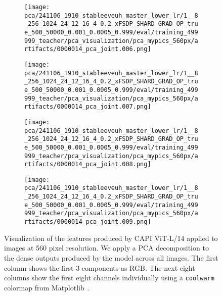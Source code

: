 \begin{figure*}[p]
\begin{subfigure}[t]{0.097\textwidth}
    \end{subfigure}\hfill
    \begin{subfigure}[t]{0.097\textwidth}
        \centering
        \texttt{[image: pca/241106\_1910\_stableeveuh\_master\_lower\_lr/1\_\_8\_256\_1024\_24\_12\_16\_4\_0.2\_xFSDP\_SHARD\_GRAD\_OP\_true\_500\_50000\_0.001\_0.0005\_0.999/eval/training\_499999\_teacher/pca\_visualization/pca\_mypics\_560px/artifacts/0000014\_pca\_joint.006.png]}
    \end{subfigure}\hfill
    \begin{subfigure}[t]{0.097\textwidth}
        \centering
        \texttt{[image: pca/241106\_1910\_stableeveuh\_master\_lower\_lr/1\_\_8\_256\_1024\_24\_12\_16\_4\_0.2\_xFSDP\_SHARD\_GRAD\_OP\_true\_500\_50000\_0.001\_0.0005\_0.999/eval/training\_499999\_teacher/pca\_visualization/pca\_mypics\_560px/artifacts/0000014\_pca\_joint.007.png]}
    \end{subfigure}\hfill
    \begin{subfigure}[t]{0.097\textwidth}
        \centering
        \texttt{[image: pca/241106\_1910\_stableeveuh\_master\_lower\_lr/1\_\_8\_256\_1024\_24\_12\_16\_4\_0.2\_xFSDP\_SHARD\_GRAD\_OP\_true\_500\_50000\_0.001\_0.0005\_0.999/eval/training\_499999\_teacher/pca\_visualization/pca\_mypics\_560px/artifacts/0000014\_pca\_joint.008.png]}
    \end{subfigure}\hfill
    \begin{subfigure}[t]{0.097\textwidth}
        \centering
        \texttt{[image: pca/241106\_1910\_stableeveuh\_master\_lower\_lr/1\_\_8\_256\_1024\_24\_12\_16\_4\_0.2\_xFSDP\_SHARD\_GRAD\_OP\_true\_500\_50000\_0.001\_0.0005\_0.999/eval/training\_499999\_teacher/pca\_visualization/pca\_mypics\_560px/artifacts/0000014\_pca\_joint.009.png]}
    \end{subfigure}
    \caption{Visualization of the features produced by CAPI ViT-L/14 applied to images at 560 pixel resolution.
We apply a PCA decomposition to the dense outputs produced by the model across all images.
The first column shows the first 3 components as RGB.
The next eight columns show the first eight channels individually using a \texttt{coolwarm} colormap from Matplotlib~\citep{matplotlib}.
}
\label{fig:pca-ours-channels}
\end{figure*}